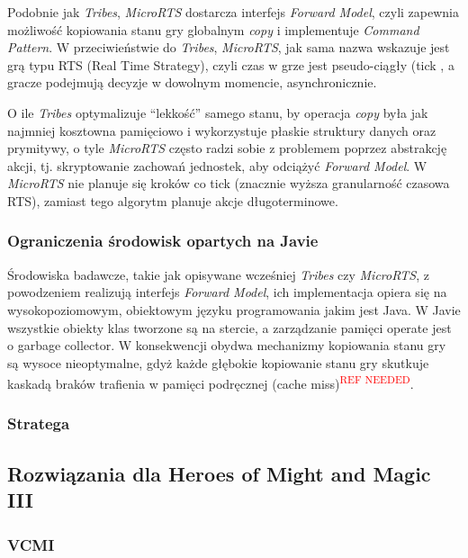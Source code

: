 \documentclass[
    bindingoffset=5mm,
    footnoteindent=3mm,
    hyphenation=true
]{src/wut-thesis}
\newcommand{\refneeded}[1]{\textsuperscript{\textcolor{red}{#1}}}
\begin{document}
Podobnie jak \emph{Tribes}, \emph{MicroRTS} dostarcza interfejs \emph{Forward Model}, czyli zapewnia
możliwość kopiowania stanu gry globalnym \emph{copy} i implementuje \emph{Command Pattern}. W
przeciwieństwie do \emph{Tribes}, \emph{MicroRTS}, jak sama nazwa wskazuje jest grą typu RTS
(Real Time Strategy), czyli czas w grze jest pseudo-ciągły (tick , a gracze podejmują
decyzje w dowolnym momencie, asynchronicznie.

O ile \emph{Tribes} optymalizuje “lekkość” samego stanu, by operacja \emph{copy} była jak najmniej
kosztowna pamięciowo i wykorzystuje płaskie struktury danych oraz prymitywy, o tyle
\emph{MicroRTS} często radzi sobie z problemem poprzez abstrakcję akcji, tj. skryptowanie
zachowań jednostek, aby odciążyć \emph{Forward Model}. W \emph{MicroRTS} nie planuje się kroków
co tick (znacznie wyższa granularność czasowa RTS), zamiast tego algorytm planuje
akcje długoterminowe.

\subsubsection{Ograniczenia środowisk opartych na Javie}

Środowiska badawcze, takie jak opisywane wcześniej \emph{Tribes} czy \emph{MicroRTS}, z
powodzeniem realizują interfejs \emph{Forward Model}, ich implementacja opiera się na
wysokopoziomowym, obiektowym języku programowania jakim jest Java. W Javie
wszystkie obiekty klas tworzone są na stercie, a zarządzanie pamięci operate jest o
garbage collector. W konsekwencji obydwa mechanizmy kopiowania stanu gry są
wysoce nieoptymalne, gdyż każde głębokie kopiowanie stanu gry skutkuje kaskadą
braków trafienia w pamięci podręcznej (cache miss)\refneeded{REF NEEDED}.

\subsubsection{Stratega}

\subsection{Rozwiązania dla Heroes of Might and Magic III}

\subsubsection{VCMI}
\end{document}
